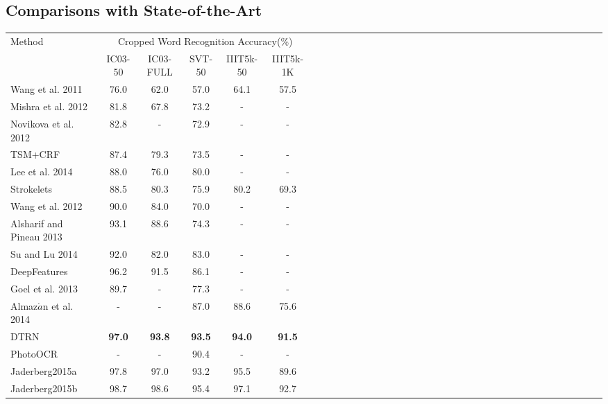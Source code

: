 \documentclass[letterpaper]{article}
\begin{document}
\subsection{Comparisons with State-of-the-Art}
 \begin{table}[tb]


\begin{multicols}{2}
\begin{minipage}[t]{0\textwidth}
\footnotesize

\begin{tabular}{|*{6}{l|c|c|c|c|c|}}


\hline
\multirow{2}{*}{Method}
&\multicolumn{5}{|c|}{Cropped Word Recognition Accuracy(\%)} \\
\cline{2-6}
&IC03-50
&IC03-FULL
&SVT-50
&IIIT5k-50
&IIIT5k-1K\\

\hline
\hline
Wang et al. 2011 & 76.0 & 62.0 & 57.0 & 64.1 & 57.5\\
Mishra et al. 2012 & 81.8 & 67.8 & 73.2 & - & -\\
Novikova et al. 2012 & 82.8 & - & 72.9 & - & -\\
TSM+CRF\cite{Shi2013} & 87.4 & 79.3 & 73.5 & - & -\\
Lee et al. 2014 & 88.0 & 76.0 & 80.0 & - & -\\
Strokelets\cite{Yao2014} & 88.5 & 80.3 & 75.9 & 80.2 & 69.3\\
\hline
Wang et al. 2012 & 90.0 & 84.0 & 70.0 & - & -\\
Alsharif and Pineau 2013 & 93.1 & 88.6 & 74.3 & - & -\\
Su and Lu 2014 &92.0&82.0&83.0&-&-\\
DeepFeatures & 96.2 & 91.5 & 86.1 & - & -\\
\hline
Goel et al. 2013 & 89.7 & - & 77.3 & - & -\\
Almaz$\acute{a}$n et al. 2014 & - & - & 87.0 & 88.6 & 75.6\\
\hline

DTRN & \textbf{97.0} & \textbf{93.8} & \textbf{93.5} & \textbf{94.0} & \textbf{91.5} \\
\hline
\hline
PhotoOCR & - & - & 90.4 & - & -\\

Jaderberg2015a & 97.8 & 97.0& 93.2 & 95.5 & 89.6\\
Jaderberg2015b & 98.7 & 98.6 & 95.4 & 97.1 & 92.7\\
\hline
\end{tabular}
\end{minipage}



\end{multicols}
\end{table}
\end{document}
